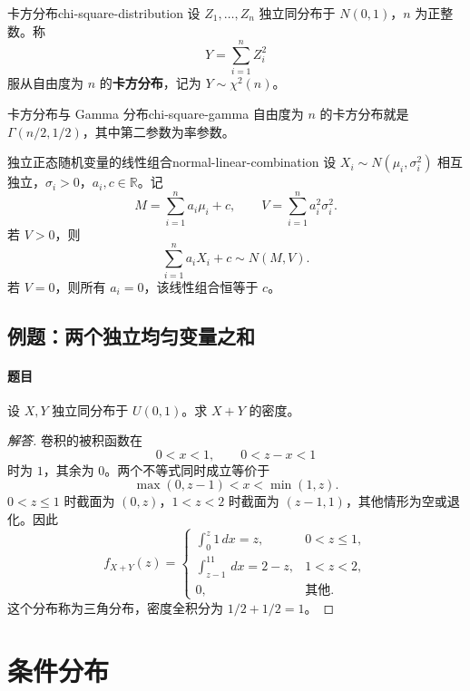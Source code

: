 \begin{mydefinition}{卡方分布}{chi-square-distribution}
设 $Z_1,\ldots,Z_n$ 独立同分布于 $N(0,1)$，$n$ 为正整数。称
\[
Y=\sum_{i=1}^nZ_i^2
\]
服从自由度为 $n$ 的\textbf{卡方分布}，记为 $Y\sim\chi^2(n)$。
\end{mydefinition}

\begin{proposition}{卡方分布与 Gamma 分布}{chi-square-gamma}
自由度为 $n$ 的卡方分布就是 $\Gamma(n/2,1/2)$，其中第二参数为率参数。
\end{proposition}

\begin{mytheorem}{独立正态随机变量的线性组合}{normal-linear-combination}
设 $X_i\sim N(\mu_i,\sigma_i^2)$ 相互独立，$\sigma_i>0$，$a_i,c\in\mathbb R$。记
\[
M=\sum_{i=1}^na_i\mu_i+c,\qquad V=\sum_{i=1}^na_i^2\sigma_i^2.
\]
若 $V>0$，则
\[
\sum_{i=1}^na_iX_i+c\sim N(M,V).
\]
若 $V=0$，则所有 $a_i=0$，该线性组合恒等于 $c$。
\end{mytheorem}

\subsection{例题：两个独立均匀变量之和}\label{note:c3:e10}
\paragraph{题目}
设 $X,Y$ 独立同分布于 $U(0,1)$。求 $X+Y$ 的密度。

\begin{proof}[解答]
卷积的被积函数在
\[
0<x<1,\qquad 0<z-x<1
\]
时为 $1$，其余为 $0$。两个不等式同时成立等价于
\[
\max(0,z-1)<x<\min(1,z).
\]
$0<z\leq1$ 时截面为 $(0,z)$，$1<z<2$ 时截面为 $(z-1,1)$，其他情形为空或退化。因此
\[
f_{X+Y}(z)=
\begin{cases}
\displaystyle\int_0^z1\,dx=z,&0<z\leq1,\\
\displaystyle\int_{z-1}^11\,dx=2-z,&1<z<2,\\
0,&\text{其他}.
\end{cases}
\]
这个分布称为三角分布，密度全积分为 $1/2+1/2=1$。
\end{proof}

\clearpage\section{条件分布}\label{k:conditionaldist}

